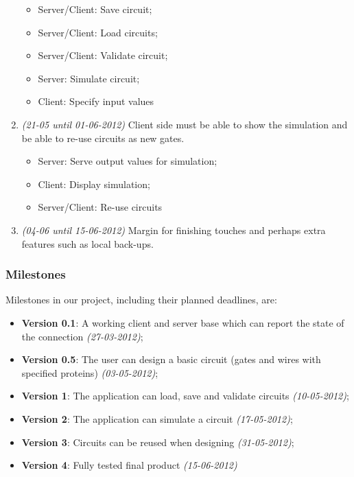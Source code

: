 \documentclass[a4paper]{article}
\begin{document}
\begin{enumerate}
	\begin{itemize}
	\item Server/Client: Save circuit;\footnotemark[2]
	\item Server/Client: Load circuits;\footnotemark[2]
	\item Server/Client: Validate circuit;\footnotemark[2]
	\item Server: Simulate circuit;
	\item Client: Specify input values
	\end{itemize}
\item \emph{(21-05 until 01-06-2012)} Client side must be able to show the simulation and be able to re-use circuits as new gates.
	\begin{itemize}
	\item Server: Serve output values for simulation;\footnotemark[2]
	\item Client: Display simulation;
	\item Server/Client: Re-use circuits
	\end{itemize}
\item \emph{(04-06 until 15-06-2012)} Margin for finishing touches and perhaps extra features such as local back-ups.
\end{enumerate}

\subsubsection{Milestones}
Milestones in our project, including their planned deadlines, are:
\begin{itemize}
\item \textbf{Version 0.1}: A working client and server base which can report the state of the connection \emph{(27-03-2012)};
\item \textbf{Version 0.5}: The user can design a basic circuit (gates and wires with specified proteins) \emph{(03-05-2012)};
\item \textbf{Version 1}: The application can load, save and validate circuits \emph{(10-05-2012)};
\item \textbf{Version 2}: The application can simulate a circuit \emph{(17-05-2012)};
\item \textbf{Version 3}: Circuits can be reused when designing \emph{(31-05-2012)};
\item \textbf{Version 4}: Fully tested final product \emph{(15-06-2012)}
\end{itemize}~\\
\end{document}
